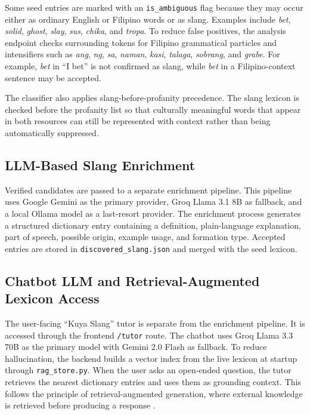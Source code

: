 Some seed entries are marked with an \texttt{is\_ambiguous} flag because they may occur either as ordinary English or Filipino words or as slang. Examples include \textit{bet}, \textit{solid}, \textit{ghost}, \textit{slay}, \textit{sus}, \textit{chika}, and \textit{tropa}. To reduce false positives, the analysis endpoint checks surrounding tokens for Filipino grammatical particles and intensifiers such as \textit{ang}, \textit{ng}, \textit{sa}, \textit{naman}, \textit{kasi}, \textit{talaga}, \textit{sobrang}, and \textit{grabe}. For example, \textit{bet} in ``I bet'' is not confirmed as slang, while \textit{bet} in a Filipino-context sentence may be accepted.

The classifier also applies slang-before-profanity precedence. The slang lexicon is checked before the profanity list so that culturally meaningful words that appear in both resources can still be represented with context rather than being automatically suppressed.

\subsection{LLM-Based Slang Enrichment}

Verified candidates are passed to a separate enrichment pipeline. This pipeline uses Google Gemini as the primary provider, Groq Llama 3.1 8B as fallback, and a local Ollama model as a last-resort provider. The enrichment process generates a structured dictionary entry containing a definition, plain-language explanation, part of speech, possible origin, example usage, and formation type. Accepted entries are stored in \texttt{discovered\_slang.json} and merged with the seed lexicon.

\subsection{Chatbot LLM and Retrieval-Augmented Lexicon Access}

The user-facing ``Kuya Slang'' tutor is separate from the enrichment pipeline. It is accessed through the frontend \texttt{/tutor} route. The chatbot uses Groq Llama 3.3 70B as the primary model with Gemini 2.0 Flash as fallback. To reduce hallucination, the backend builds a vector index from the live lexicon at startup through \texttt{rag\_store.py}. When the user asks an open-ended question, the tutor retrieves the nearest dictionary entries and uses them as grounding context. This follows the principle of retrieval-augmented generation, where external knowledge is retrieved before producing a response \cite{b10}.

